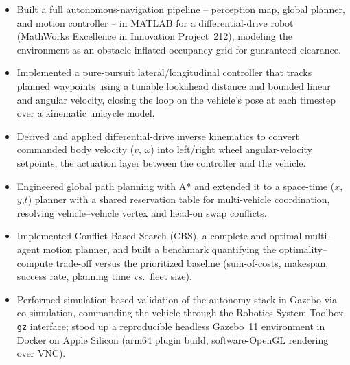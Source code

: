 \begin{itemize}
  \item Built a full autonomous-navigation pipeline -- perception map,
        global planner, and motion controller -- in MATLAB for a
        differential-drive robot (MathWorks Excellence in Innovation
        Project~212), modeling the environment as an obstacle-inflated
        occupancy grid for guaranteed clearance.
  \item Implemented a pure-pursuit lateral/longitudinal controller that tracks
        planned waypoints using a tunable lookahead distance and bounded
        linear and angular velocity, closing the loop on the vehicle's pose at
        each timestep over a kinematic unicycle model.
  \item Derived and applied differential-drive inverse kinematics to convert
        commanded body velocity ($v$, $\omega$) into left/right wheel
        angular-velocity setpoints, the actuation layer between the
        controller and the vehicle.
  \item Engineered global path planning with A* and extended it to a
        space-time ($x$,$y$,$t$) planner with a shared reservation table for
        multi-vehicle coordination, resolving vehicle--vehicle vertex and
        head-on swap conflicts.
  \item Implemented Conflict-Based Search (CBS), a complete and optimal
        multi-agent motion planner, and built a benchmark quantifying the
        optimality--compute trade-off versus the prioritized baseline
        (sum-of-costs, makespan, success rate, planning time vs.\ fleet size).
  \item Performed simulation-based validation of the autonomy stack in Gazebo
        via co-simulation, commanding the vehicle through the Robotics System
        Toolbox \texttt{gz} interface; stood up a reproducible headless
        Gazebo~11 environment in Docker on Apple Silicon (arm64 plugin build,
        software-OpenGL rendering over VNC).
\end{itemize}

